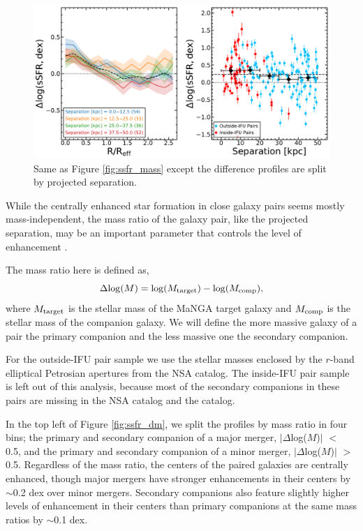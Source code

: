 \documentclass[iop,revtex4,twocolumn,apj,numberedappendix,appendixfloats]{emulateapj}
\begin{document}
\begin{figure}
\centering
\includegraphics[width=0.8\linewidth]{fig/ssfr_sep.pdf}
\caption[]{Same as Figure \ref{fig:ssfr_mass} except the difference profiles are split by projected separation. }
\label{fig:ssfr_sep}
\end{figure}

While the centrally enhanced star formation in close galaxy pairs seems mostly mass-independent, the mass ratio of the galaxy pair, like the projected separation, may be an important parameter that controls the level of enhancement \citep{Ellison:2008}. 

The mass ratio here is defined as, 
\begin{equation}
\Delta {\rm log}(M) = {\rm log}(M_{\rm target}) - {\rm log}(M_{\rm comp}),
\end{equation}
where $M_{\rm target}$ is the stellar mass of the MaNGA target galaxy and $M_{\rm comp}$ is the stellar mass of the companion galaxy. We will define the more massive galaxy of a pair the primary companion and the less massive one the secondary companion.

For the outside-IFU pair sample we use the stellar masses enclosed by the $r$-band elliptical Petrosian apertures from the NSA catalog. The inside-IFU pair sample is left out of this analysis, because most of the secondary companions in these pairs are missing in the NSA catalog and the \citet{Simard:2011} catalog.

In the top left of Figure \ref{fig:ssfr_dm}, we split the profiles by mass ratio in four bins; the primary and secondary companion of a major merger, $|\Delta$log($M$)$|$ $<$ 0.5, and the primary and secondary companion of a minor merger, $|\Delta$log($M$)$|$ $>$ 0.5. Regardless of the mass ratio, the centers of the paired galaxies are centrally enhanced, though major mergers have stronger enhancements in their centers by $\sim$0.2 dex over minor mergers. Secondary companions also feature slightly higher levels of enhancement in their centers than primary companions at the same mass ratios by $\sim$0.1 dex. 
\end{document}
